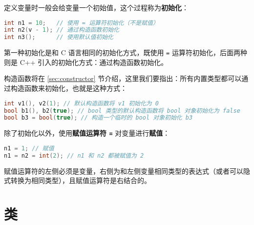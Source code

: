 \documentclass[hyperref,UTF8]{article}
\begin{document}
定义变量时一般会给变量一个初始值，这个过程称为\textbf{初始化}：
\begin{lstlisting}[language=c++]
int n1 = 10;   // 使用 = 运算符初始化（不是赋值）
int n2(v - 1); // 通过构造函数初始化
int n3();      // 使用默认值初始化
\end{lstlisting}
第一种初始化是和 C 语言相同的初始化方式，既使用 \texttt{=} 运算符初始化，后面两种则是 C++ 引入的初始化方式：通过构造函数初始化。

构造函数将在 \ref{sec:constructor} 节介绍，这里我们要指出：所有内置类型都可以通过构造函数来初始化，也就是这种方式：
\begin{lstlisting}[language=c++]
int v1(), v2(1); // 默认构造函数将 v1 初始化为 0
bool b1(), b2(true); // bool 类型的默认构造函数将 bool 对象初始化为 false
bool b3 = bool(true); // 构造一个临时的 bool 对象初始化 b3
\end{lstlisting}

除了初始化以外，使用\textbf{赋值运算符 \texttt{=}} 对变量进行\textbf{赋值}：
\begin{lstlisting}[language=c++]
n1 = 1; // 赋值
n1 = n2 = int(2); // n1 和 n2 都被赋值为 2
\end{lstlisting}
赋值运算符的左侧必须是变量，右侧为和左侧变量相同类型的表达式（或者可以隐式转换为相同类型），且赋值运算符是右结合的。

\section{类}
\end{document}
